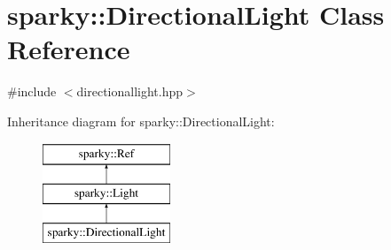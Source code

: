 \hypertarget{classsparky_1_1_directional_light}{}\section{sparky\+:\+:Directional\+Light Class Reference}
\label{classsparky_1_1_directional_light}


{\ttfamily \#include $<$directionallight.\+hpp$>$}

Inheritance diagram for sparky\+:\+:Directional\+Light\+:\begin{figure}[H]
\begin{center}
\leavevmode
\includegraphics[height=3.000000cm]{classsparky_1_1_directional_light}
\end{center}
\end{figure}

